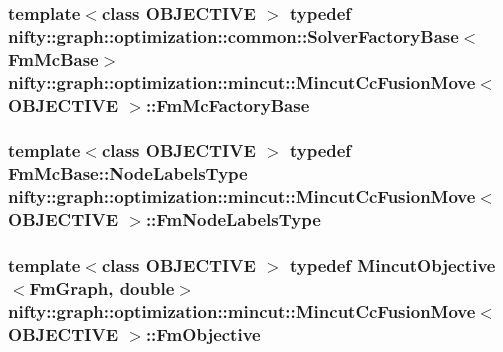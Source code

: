 \subsubsection[{Fm\+Mc\+Factory\+Base}]{\setlength{\rightskip}{0pt plus 5cm}template$<$class O\+B\+J\+E\+C\+T\+I\+V\+E $>$ typedef {\bf nifty\+::graph\+::optimization\+::common\+::\+Solver\+Factory\+Base}$<${\bf Fm\+Mc\+Base}$>$ {\bf nifty\+::graph\+::optimization\+::mincut\+::\+Mincut\+Cc\+Fusion\+Move}$<$ O\+B\+J\+E\+C\+T\+I\+V\+E $>$\+::{\bf Fm\+Mc\+Factory\+Base}}\label{classnifty_1_1graph_1_1optimization_1_1mincut_1_1MincutCcFusionMove_aa1890aca393a3d5f4ee342304d74ddba}
\hypertarget{classnifty_1_1graph_1_1optimization_1_1mincut_1_1MincutCcFusionMove_aa8bd6f10d00805a7aa2151ec3cb813f1}{}
\subsubsection[{Fm\+Node\+Labels\+Type}]{\setlength{\rightskip}{0pt plus 5cm}template$<$class O\+B\+J\+E\+C\+T\+I\+V\+E $>$ typedef {\bf Fm\+Mc\+Base\+::\+Node\+Labels\+Type} {\bf nifty\+::graph\+::optimization\+::mincut\+::\+Mincut\+Cc\+Fusion\+Move}$<$ O\+B\+J\+E\+C\+T\+I\+V\+E $>$\+::{\bf Fm\+Node\+Labels\+Type}}\label{classnifty_1_1graph_1_1optimization_1_1mincut_1_1MincutCcFusionMove_aa8bd6f10d00805a7aa2151ec3cb813f1}
\hypertarget{classnifty_1_1graph_1_1optimization_1_1mincut_1_1MincutCcFusionMove_af3e387f919e56c6411c67533aa781686}{}
\subsubsection[{Fm\+Objective}]{\setlength{\rightskip}{0pt plus 5cm}template$<$class O\+B\+J\+E\+C\+T\+I\+V\+E $>$ typedef {\bf Mincut\+Objective}$<${\bf Fm\+Graph}, double$>$ {\bf nifty\+::graph\+::optimization\+::mincut\+::\+Mincut\+Cc\+Fusion\+Move}$<$ O\+B\+J\+E\+C\+T\+I\+V\+E $>$\+::{\bf Fm\+Objective}}\label{classnifty_1_1graph_1_1optimization_1_1mincut_1_1MincutCcFusionMove_af3e387f919e56c6411c67533aa781686}
\hypertarget{classnifty_1_1graph_1_1optimization_1_1mincut_1_1MincutCcFusionMove_a046fcef6e07277b118e6e0b42417b47e}{}
